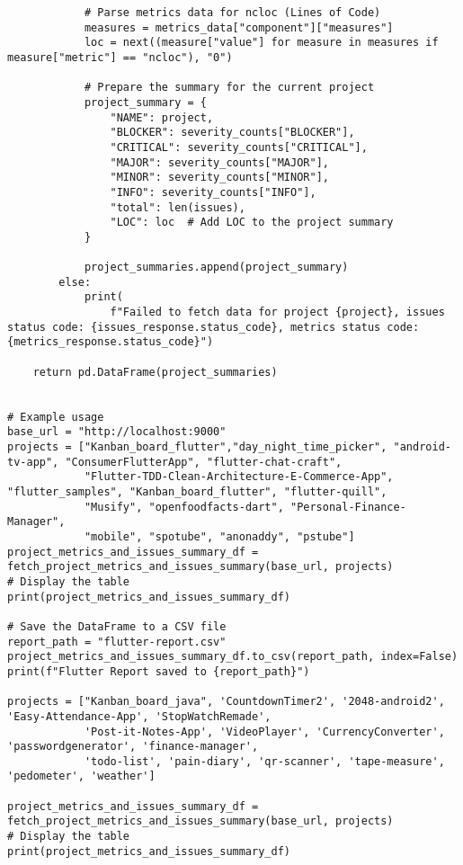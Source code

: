 \begin{lstlisting}
            # Parse metrics data for ncloc (Lines of Code)
            measures = metrics_data["component"]["measures"]
            loc = next((measure["value"] for measure in measures if measure["metric"] == "ncloc"), "0")

            # Prepare the summary for the current project
            project_summary = {
                "NAME": project,
                "BLOCKER": severity_counts["BLOCKER"],
                "CRITICAL": severity_counts["CRITICAL"],
                "MAJOR": severity_counts["MAJOR"],
                "MINOR": severity_counts["MINOR"],
                "INFO": severity_counts["INFO"],
                "total": len(issues),
                "LOC": loc  # Add LOC to the project summary
            }

            project_summaries.append(project_summary)
        else:
            print(
                f"Failed to fetch data for project {project}, issues status code: {issues_response.status_code}, metrics status code: {metrics_response.status_code}")

    return pd.DataFrame(project_summaries)


# Example usage
base_url = "http://localhost:9000"
projects = ["Kanban_board_flutter","day_night_time_picker", "android-tv-app", "ConsumerFlutterApp", "flutter-chat-craft",
            "Flutter-TDD-Clean-Architecture-E-Commerce-App", "flutter_samples", "Kanban_board_flutter", "flutter-quill",
            "Musify", "openfoodfacts-dart", "Personal-Finance-Manager",
            "mobile", "spotube", "anonaddy", "pstube"]
project_metrics_and_issues_summary_df = fetch_project_metrics_and_issues_summary(base_url, projects)
# Display the table
print(project_metrics_and_issues_summary_df)

# Save the DataFrame to a CSV file
report_path = "flutter-report.csv"
project_metrics_and_issues_summary_df.to_csv(report_path, index=False)
print(f"Flutter Report saved to {report_path}")

projects = ["Kanban_board_java", 'CountdownTimer2', '2048-android2', 'Easy-Attendance-App', 'StopWatchRemade',
            'Post-it-Notes-App', 'VideoPlayer', 'CurrencyConverter', 'passwordgenerator', 'finance-manager',
            'todo-list', 'pain-diary', 'qr-scanner', 'tape-measure', 'pedometer', 'weather']

project_metrics_and_issues_summary_df = fetch_project_metrics_and_issues_summary(base_url, projects)
# Display the table
print(project_metrics_and_issues_summary_df)


\end{lstlisting}
